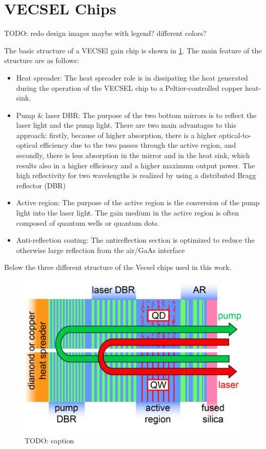 \section{VECSEL Chips}\label{sec:vecsel}

TODO: redo design images maybe with legend? different colors?

The basic structure of a VECSEl gain chip is shown in \cref{fig:vecDes}. The main feature of the structure are as follows: 

\begin{itemize}
    \item Heat spreader: The heat spreader role is in dissipating the heat generated during the operation of the VECSEL chip to a Peltier-controlled copper heat-sink.
    \item Pump \& laser  DBR: The purpose of the two bottom mirrors is to reflect the laser light and the pump light. There are two main advantages to this approach: firstly, because of higher absorption, there is a higher optical-to-optical efficiency due to the two passes through the active region, and secondly, there is less absorption in the mirror and in the heat sink, which results also in a higher efficiency and a higher maximum output power. The high reflectivity for two wavelengths is realized by using a distributed Bragg reflector (DBR)
    \item Active region: The purpose of the active region is the conversion of the pump light into the laser light. The gain medium in the active region is often composed of quantum wells or quantum dots.
    \item Anti-reflection coating: The antireflection section is optimized to reduce the otherwise large reflection from the air/GaAs interface
\end{itemize}

Below the three different structure of the Vecsel chips used in this work.

\begin{figure}[ht]
    \centering
    \includegraphics[width=.6\linewidth]{images/VECSEL_structure.png}
    \caption{TODO: caption}
    \label{fig:vecDes}
\end{figure}


